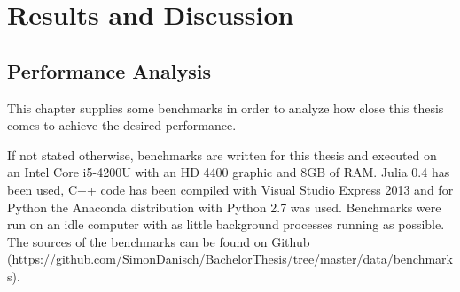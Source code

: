 \section{Results and Discussion}

\subsection{Performance Analysis}
This chapter supplies some benchmarks in order to analyze how close this thesis comes to achieve the desired performance.

If not stated otherwise, benchmarks are written for this thesis and executed on an Intel Core i5-4200U with an HD 4400 graphic and 8GB of RAM.
Julia 0.4 has been used, C++ code has been compiled with Visual Studio Express 2013 and for Python the Anaconda distribution with Python 2.7 was used.
Benchmarks were run on an idle computer with as little background processes running as possible.
The sources of the benchmarks can be found on Github (https://github.com/SimonDanisch/BachelorThesis/tree/master/data/benchmarks).

